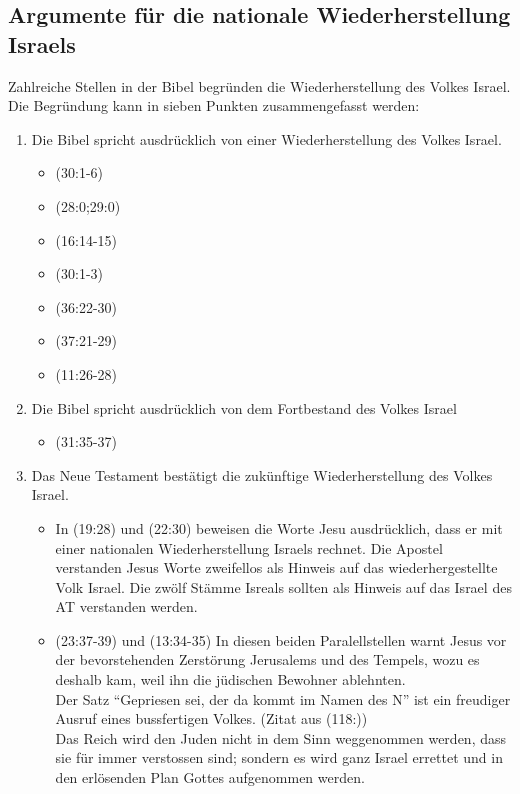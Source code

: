 \documentclass[fontsize=14pt]{../../inc/mybib}
\begin{document}
\subsection{Argumente für die nationale Wiederherstellung Israels}
Zahlreiche Stellen in der Bibel begründen die Wiederherstellung des Volkes Israel. Die Begründung kann in sieben Punkten zusammengefasst werden:
\begin{enumerate}
    \item Die Bibel spricht ausdrücklich von einer Wiederherstellung des Volkes Israel.
    \begin{itemize}
        \item {}(30:1-6)
        \item {}(28:0;29:0)
        \item {}(16:14-15)
        \item {}(30:1-3)
        \item {}(36:22-30)
        \item {}(37:21-29)
        \item {}(11:26-28)
    \end{itemize}    
    \item Die Bibel spricht ausdrücklich von dem Fortbestand des Volkes Israel
    \begin{itemize}
        \item {}(31:35-37)
    \end{itemize}
    \item Das Neue Testament bestätigt die zukünftige Wiederherstellung des Volkes Israel.
    \begin{itemize}
        \item In (19:28) und (22:30) beweisen die Worte Jesu ausdrücklich, dass er mit einer nationalen Wiederherstellung Israels rechnet. Die Apostel verstanden Jesus Worte zweifellos als Hinweis auf das wiederhergestellte Volk Israel. Die zwölf Stämme Isreals sollten als Hinweis auf das Israel des AT verstanden werden.
        \item {}(23:37-39) und (13:34-35) In diesen beiden Paralellstellen warnt Jesus vor der bevorstehenden Zerstörung Jerusalems und des Tempels, wozu es deshalb kam, weil ihn die jüdischen Bewohner ablehnten.\\ Der Satz \enquote{Gepriesen sei, der da kommt im Namen des \herr N} ist ein freudiger Ausruf eines bussfertigen Volkes. (Zitat aus (118:)) \\ Das Reich wird den Juden nicht in dem Sinn weggenommen werden, dass sie für immer verstossen sind; sondern es wird \flq ganz Israel\frq{} errettet und in den erlösenden Plan Gottes aufgenommen werden.

\end{itemize}
\end{enumerate}
\end{document}
